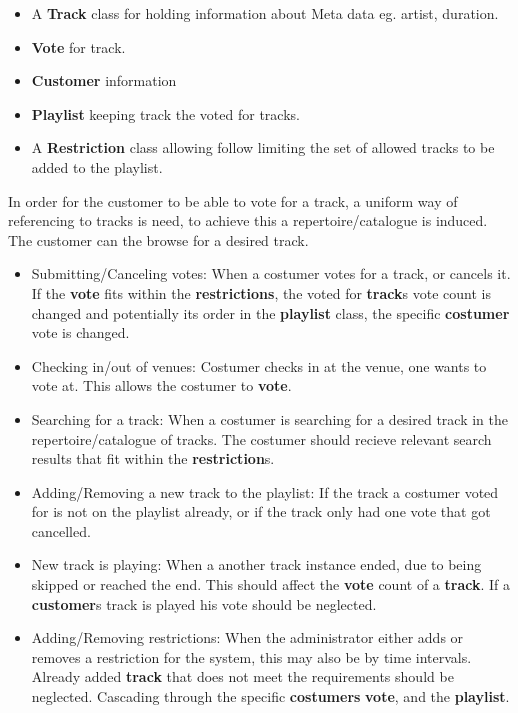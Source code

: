 \begin{itemize}
\item A \textbf{Track} class for holding information about Meta data eg. artist, duration.
\item \textbf{Vote} for track.
\item \textbf{Customer} information
\item \textbf{Playlist} keeping track the voted for tracks.
\item A \textbf{Restriction} class allowing follow limiting the set of allowed tracks to be added to the playlist.
\end{itemize}

In order for the customer to be able to vote for a track, a uniform way of referencing to tracks is need, to achieve this a repertoire/catalogue  is induced. The customer can the browse for a desired track.

\begin{itemize}
\item Submitting/Canceling votes:
    When a costumer votes for a track, or cancels it. If the \textbf{vote} fits within the \textbf{restrictions}, the voted for \textbf{track}s vote count is changed and potentially its order in the \textbf{playlist} class, the specific \textbf{costumer} vote is changed.
\item Checking in/out of venues:
    Costumer checks in at the venue, one wants to vote at. This allows the costumer to \textbf{vote}.
\item Searching for a track:
    When a costumer is searching for a desired track in the repertoire/catalogue of tracks. The costumer should recieve relevant search results that fit within the \textbf{restriction}s.
\item Adding/Removing a new track to the playlist:
    If the track a costumer voted for is not on the playlist already, or if the track only had one vote that got cancelled.
\item New track is playing:
    When a another track instance ended, due to being skipped or reached the end. This should affect the \textbf{vote} count of a \textbf{track}. If a \textbf{customer}s track is played his vote should be neglected.
\item Adding/Removing restrictions:
    When the administrator either adds or removes a restriction for the system, this may also be by time intervals. Already added \textbf{track} that does not meet the requirements should be neglected. Cascading through the specific \textbf{costumers} \textbf{vote}, and the \textbf{playlist}.
\end{itemize}

